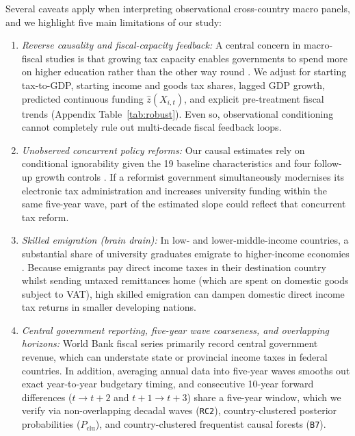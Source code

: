\documentclass[11pt,a4paper]{article}
\begin{document}
Several caveats apply when interpreting observational cross-country macro panels, and we highlight five main limitations of our study:
\begin{enumerate}
  \item \emph{Reverse causality and fiscal-capacity feedback:} A central concern in macro-fiscal studies is that growing tax capacity enables governments to spend more on higher education rather than the other way round \citep{baumol1967macroeconomics, unesco2024efw, worldbank2024taxing}. We adjust for starting tax-to-GDP, starting income and goods tax shares, lagged GDP growth, predicted continuous funding $\hat{z}(X_{i,t})$, and explicit pre-treatment fiscal trends (Appendix Table~\ref{tab:robust}). Even so, observational conditioning cannot completely rule out multi-decade fiscal feedback loops.
  \item \emph{Unobserved concurrent policy reforms:} Our causal estimates rely on conditional ignorability given the 19 baseline characteristics and four follow-up growth controls \citep{imai2010general, acharya2016explaining}. If a reformist government simultaneously modernises its electronic tax administration \citep{pomeranz2019taking, okunogbe2022technology} and increases university funding within the same five-year wave, part of the estimated slope could reflect that concurrent tax reform.
  \item \emph{Skilled emigration (brain drain):} In low- and lower-middle-income countries, a substantial share of university graduates emigrate to higher-income economies \citep{beine2008brain}. Because emigrants pay direct income taxes in their destination country whilst sending untaxed remittances home (which are spent on domestic goods subject to VAT), high skilled emigration can dampen domestic direct income tax returns in smaller developing nations.
  \item \emph{Central government reporting, five-year wave coarseness, and overlapping horizons:} World Bank fiscal series primarily record central government revenue, which can understate state or provincial income taxes in federal countries. In addition, averaging annual data into five-year waves smooths out exact year-to-year budgetary timing, and consecutive 10-year forward differences ($t \to t+2$ and $t+1 \to t+3$) share a five-year window, which we verify via non-overlapping decadal waves (\texttt{RC2}), country-clustered posterior probabilities ($P_{\text{clu}}$), and country-clustered frequentist causal forests (\texttt{B7}).

\end{enumerate}
\end{document}
